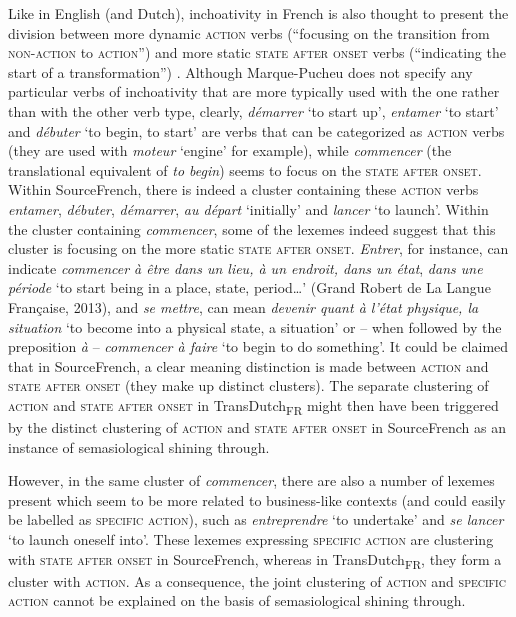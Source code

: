 Like in English (and Dutch), inchoativity in French is also thought to present the division between more dynamic \textsc{action} verbs (“focusing on the transition from \textsc{non-action} to \textsc{action}”) and more static \textsc{state after onset} verbs (“indicating the start of a transformation”) \citep[241]{vogeleer_linchoatif:_1999}. Although Marque-Pucheu does not specify any particular verbs of inchoativity that are more typically used with the one rather than with the other verb type, clearly, \textit{démarrer} `to start up', \textit{entamer} `to start' and \textit{débuter} `to begin, to start' are verbs that can be categorized as \textsc{action} verbs (they are used with \textit{moteur} `engine' for example), while \textit{commencer} (the translational equivalent of \textit{to begin}) seems to focus on the \textsc{state after onset}. Within SourceFrench, there is indeed a cluster containing these \textsc{action} verbs \textit{entamer}, \textit{débuter}, \textit{démarrer}, \textit{au départ} `initially' and \textit{lancer} `to launch'. Within the cluster containing \textit{commencer}, some of the lexemes indeed suggest that this cluster is focusing on the more static \textsc{state after onset}. \textit{Entrer}, for instance, can indicate \textit{commencer à être dans un lieu, à un endroit, dans un état}, \textit{dans une période} `to start being in a place, state, period…' (Grand Robert de La Langue Française, 2013), and \textit{se mettre}, can mean \textit{devenir quant à l'état physique, la situation} `to become into a physical state, a situation' or -- when followed by the preposition \textit{à} – \textit{commencer à faire} `to begin to do something'. It could be claimed that in SourceFrench, a clear meaning distinction is made between \textsc{action} and \textsc{state after onset} (they make up distinct clusters). The separate clustering of \textsc{action} and \textsc{state after onset} in TransDutch\textsubscript{FR} might then have been triggered by the distinct clustering of \textsc{action} and \textsc{state after onset} in SourceFrench as an instance of semasiological shining through.

However, in the same cluster of \textit{commencer}, there are also a number of lexemes present which seem to be more related to business-like contexts (and could easily be labelled as {\textsc{specific}} \textsc{action}), such as \textit{entreprendre} `to undertake' and \textit{se lancer} `to launch oneself into'. These lexemes expressing {\textsc{specific}} \textsc{action} are clustering with \textsc{state after onset} in SourceFrench, whereas in TransDutch\textsubscript{FR}, they form a cluster with \textsc{action}. As a consequence, the joint clustering of \textsc{action} and {\textsc{specific}} \textsc{action} cannot be explained on the basis of semasiological shining through.

